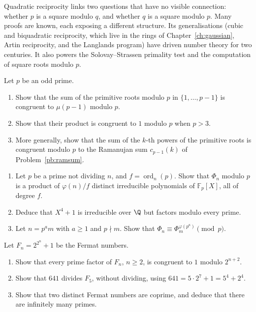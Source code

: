 \begin{beauty}
Quadratic reciprocity links two questions that have no visible connection: whether $p$ is a square modulo $q$, and whether $q$ is a square modulo $p$. Many proofs are known, each exposing a different structure. Its generalisations (cubic and biquadratic reciprocity, which live in the rings of Chapter~\ref{ch:gaussian}, Artin reciprocity, and the Langlands program) have driven number theory for two centuries. It also powers the Solovay--Strassen primality test and the computation of square roots modulo $p$.
\end{beauty}

\begin{exercise}[$\star\star$]\label{pb:primsum}
Let $p$ be an odd prime.
\begin{enumerate}[label=(\alph*)]
\item Show that the sum of the primitive roots modulo $p$ in $\{1,\dots,p-1\}$ is congruent to $\mu(p-1)$ modulo $p$.
\item Show that their product is congruent to $1$ modulo $p$ when $p>3$.
\item More generally, show that the sum of the $k$-th powers of the primitive roots is congruent modulo $p$ to the
Ramanujan sum $c_{p-1}(k)$ of Problem~\ref{pb:ramsum}.
\end{enumerate}
\end{exercise}

\begin{exercise}[$\star\star$]\label{pb:phimodp}
\begin{enumerate}[label=(\alph*)]
\item Let $p$ be a prime not dividing $n$, and $f=\operatorname{ord}_n(p)$. Show that $\Phi_n$ modulo $p$ is a product of
$\varphi(n)/f$ distinct irreducible polynomials of $\mathbb F_p[X]$, all of degree $f$.
\item Deduce that $X^4+1$ is irreducible over $\Q$ but factors modulo every prime.
\item Let $n=p^am$ with $a\ge1$ and $p\nmid m$. Show that $\Phi_n\equiv\Phi_m^{\varphi(p^a)}\pmod p$.
\end{enumerate}
\end{exercise}

\begin{exercise}[$\star$]\label{pb:fermatnum}
Let $F_n=2^{2^n}+1$ be the Fermat numbers.
\begin{enumerate}[label=(\alph*)]
\item Show that every prime factor of $F_n$, $n\ge2$, is congruent to $1$ modulo $2^{n+2}$.
\item Show that $641$ divides $F_5$, without dividing, using $641=5\cdot2^7+1=5^4+2^4$.
\item Show that two distinct Fermat numbers are coprime, and deduce that there are infinitely many primes.
\end{enumerate}
\end{exercise}

